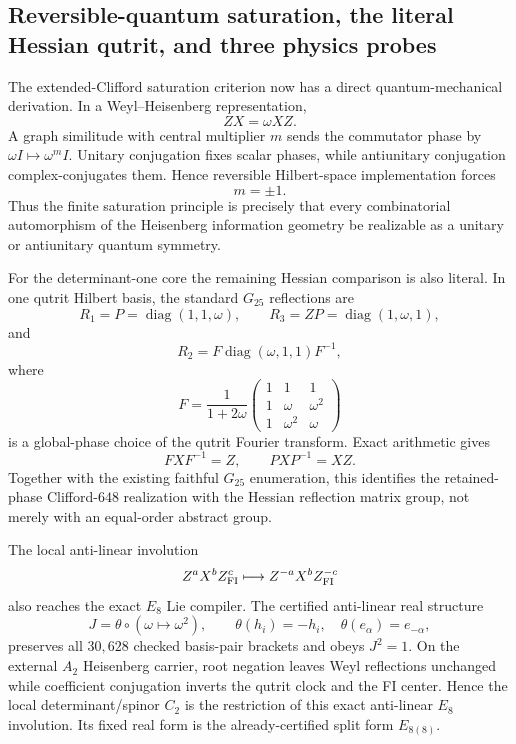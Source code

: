 \subsection*{Reversible-quantum saturation, the literal Hessian qutrit, and three physics probes}

The extended-Clifford saturation criterion now has a direct quantum-mechanical
derivation.  In a Weyl--Heisenberg representation,
\[
ZX=\omega XZ.
\]
A graph similitude with central multiplier $m$ sends the commutator phase by
$\omega I\mapsto\omega^m I$.  Unitary conjugation fixes scalar phases, while
antiunitary conjugation complex-conjugates them.  Hence reversible
Hilbert-space implementation forces
\[
\boxed{m=\pm1.}
\]
Thus the finite saturation principle is precisely that every combinatorial
automorphism of the Heisenberg information geometry be realizable as a
unitary or antiunitary quantum symmetry.

For the determinant-one core the remaining Hessian comparison is also
literal.  In one qutrit Hilbert basis, the standard $G_{25}$ reflections are
\[
R_1=P=\operatorname{diag}(1,1,\omega),
\qquad
R_3=ZP=\operatorname{diag}(1,\omega,1),
\]
and
\[
R_2=F\operatorname{diag}(\omega,1,1)F^{-1},
\]
where
\[
F=
\frac{1}{1+2\omega}
\begin{pmatrix}
1&1&1\\
1&\omega&\omega^2\\
1&\omega^2&\omega
\end{pmatrix}
\]
is a global-phase choice of the qutrit Fourier transform.  Exact arithmetic
gives
\[
FXF^{-1}=Z,
\qquad
PXP^{-1}=XZ.
\]
Together with the existing faithful $G_{25}$ enumeration, this identifies the
retained-phase Clifford-$648$ realization with the Hessian reflection matrix
group, not merely with an equal-order abstract group.

The local anti-linear involution
\[
Z^aX^bZ_{\rm FI}^c
\longmapsto
Z^{-a}X^bZ_{\rm FI}^{-c}
\]
also reaches the exact $E_8$ Lie compiler.  The certified anti-linear real
structure
\[
J=\theta\circ(\omega\mapsto\omega^2),
\qquad
\theta(h_i)=-h_i,
\quad
\theta(e_\alpha)=e_{-\alpha},
\]
preserves all $30{,}628$ checked basis-pair brackets and obeys $J^2=1$.
On the external $A_2$ Heisenberg carrier, root negation leaves Weyl
reflections unchanged while coefficient conjugation inverts the qutrit clock
and the FI center.  Hence the local determinant/spinor $C_2$ is the
restriction of this exact anti-linear $E_8$ involution.  Its fixed real form is
the already-certified split form $E_{8(8)}$.

